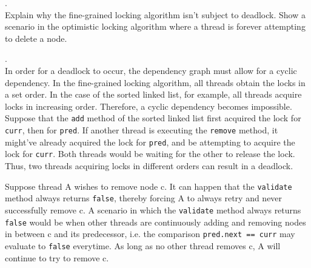 \documentclass[main]{subfiles}
\begin{document}
\begin{ExerciseList}
        
        \Exercise[title={Lock Granularity},label=LG].\quad \\
            \Question Explain why the fine-grained locking algorithm isn't subject to deadlock.
            \Question Show a scenario in the optimistic locking algorithm where a thread is forever attempting to delete a node.
        \pagebreak
            
        \Answer[ref={LG}].\quad \\
            \Question In order for a deadlock to occur, the dependency graph must allow for a cyclic dependency. In the fine-grained locking algorithm, all threads obtain the locks in a set order. In the case of the sorted linked list, for example, all threads acquire locks in increasing order. Therefore, a cyclic dependency becomes impossible.\\[3mm]
            Suppose that the \texttt{add} method of the sorted linked list first acquired the lock for \texttt{curr}, then for \texttt{pred}. If another thread is executing the \texttt{remove} method, it might've already acquired the lock for \texttt{pred}, and be attempting to acquire the lock for \texttt{curr}. Both threads would be waiting for the other to release the lock. Thus, two threads acquiring locks in different orders can result in a deadlock.
            
            \pagebreak
            
            \Question Suppose thread A wishes to remove node c. It can happen that the \texttt{validate} method always returns \texttt{false}, thereby forcing A to always retry and never successfully remove c. A scenario in which the \texttt{validate} method always returns \texttt{false} would be when other threads are continuously adding and removing nodes in between c and its predecessor, i.e. the comparison \texttt{pred.next == curr} may evaluate to \texttt{false} everytime. As long as no other thread removes c, A will continue to try to remove c.


\end{ExerciseList}
\end{document}
